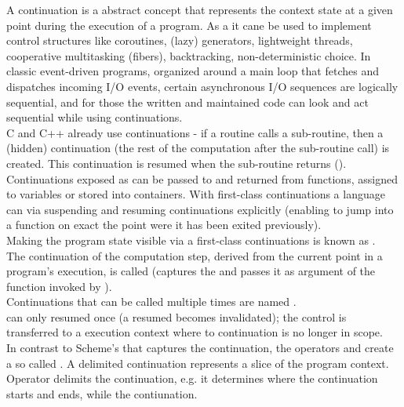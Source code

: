 
A continuation is a abstract concept that represents the context state at a
given point during the execution of a program. As a  it cane be used to implement control structures like coroutines,
(lazy) generators, lightweight threads, cooperative multitasking (fibers),
backtracking, non-deterministic choice. In classic event-driven programs,
organized around a main loop that fetches and dispatches incoming I/O events,
certain asynchronous I/O sequences are logically sequential, and for those the
written and maintained code can look and act sequential while using
continuations.\\

C and C++ already use continuations - if a routine calls a sub-routine, then a
(hidden) continuation (the rest of the computation after the sub-routine call)
is created. This continuation is resumed when the sub-routine returns
().\\

Continuations exposed as  can be passed to and
returned from functions, assigned to variables or stored into containers. With
first-class continuations a language can 
via suspending and resuming continuations explicitly (enabling to jump into a
function on exact the point were it has been exited previously).\\
Making the program state visible via a first-class continuations is known as
.\\

The continuation of the computation step, derived from the current point in a
program's execution, is called  (\cc captures the
 and passes it as argument of the function invoked by
\cc).\\

Continuations that can be called multiple times are named
.\\
 can only resumed once (a resumed 
 becomes invalidated); the control is transferred to
a execution context where to continuation is no longer in scope.\\

In contrast to Scheme's \cc that captures the 
continuation, the operators \shift and \reset create a so called . A delimited continuation represents a slice of the program
context. Operator \reset delimits the continuation, e.g. it determines where the
continuation starts and ends, while \shift {} the contiunation.
